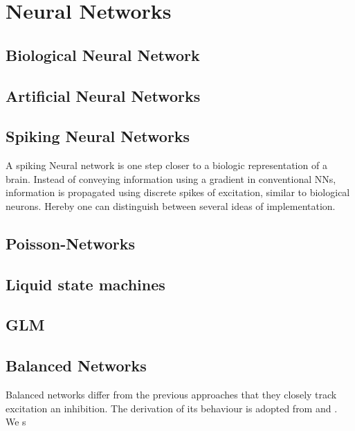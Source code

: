 \section{Neural Networks}

\subsection{Biological Neural Network}

\subsection{Artificial Neural Networks}
\subsection{Spiking Neural Networks}
A spiking Neural network is one step closer to a biologic representation of a brain. Instead of conveying information using a gradient in conventional \ac{NN}s, information is propagated using discrete spikes of excitation, similar to biological neurons. Hereby one can distinguish between several ideas of implementation.

\subsection{Poisson-Networks}

\subsection{Liquid state machines}

\subsection{GLM}

\subsection{Balanced Networks}
Balanced networks differ from the previous approaches that they closely track excitation an inhibition. The derivation of its behaviour is adopted from \cite{boerlin_predictive_2013} and \cite{huang_optimizing_2017}.\\
We s



